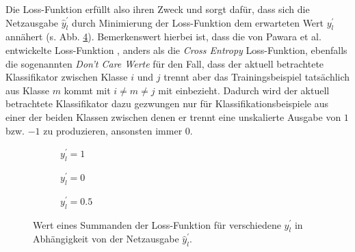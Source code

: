 Die Loss-Funktion erfüllt also ihren Zweck und sorgt dafür, dass sich die Netzausgabe $\widehat{y}_{l}^{'}$ durch Minimierung der Loss-Funktion dem erwarteten Wert $y_{l}^{'}$ annähert (s. Abb. \ref{fig:OvOLoss}). Bemerkenswert hierbei ist, dass die von Pawara et al. entwickelte Loss-Funktion \cite{pawaraPaper}, anders als die \textit{Cross Entropy} Loss-Funktion, ebenfalls die sogenannten \textit{Don't Care Werte} für den Fall, dass der aktuell betrachtete Klassifikator zwischen Klasse $i$ und $j$ trennt aber das Trainingsbeispiel tatsächlich aus Klasse $m$ kommt mit $i\neq m \neq j$ mit einbezieht. Dadurch wird der aktuell betrachtete Klassifikator dazu gezwungen nur für Klassifikationsbeispiele aus einer der beiden Klassen zwischen denen er trennt eine unskalierte Ausgabe von $1$ bzw. $-1$ zu produzieren, ansonsten immer $0$.

\begin{figure}[H]
\centering
\begin{subfigure}{.3\textwidth}
\begin{adjustbox}{width=\textwidth, center}

\end{adjustbox}
\caption{$y_l^{'}=1$}
\label{fig:OvOLoss-y1}
\end{subfigure}
\begin{subfigure}{.3\textwidth}
\begin{adjustbox}{width=\textwidth, center}

\end{adjustbox}
\caption{$y_l^{'}=0$}
\label{fig:OvOLoss-y0}
\end{subfigure}
\begin{subfigure}{.3\textwidth}
\begin{adjustbox}{width=\textwidth, center}

\end{adjustbox}
\caption{$y_l^{'}=0.5$}
\label{fig:OvOLoss-y05}
\end{subfigure}
\caption{Wert eines Summanden der Loss-Funktion für verschiedene $y_l^{'}$ in Abhängigkeit von der Netzausgabe $\widehat{y}_l^{'}$.}
\label{fig:OvOLoss}
\end{figure}

